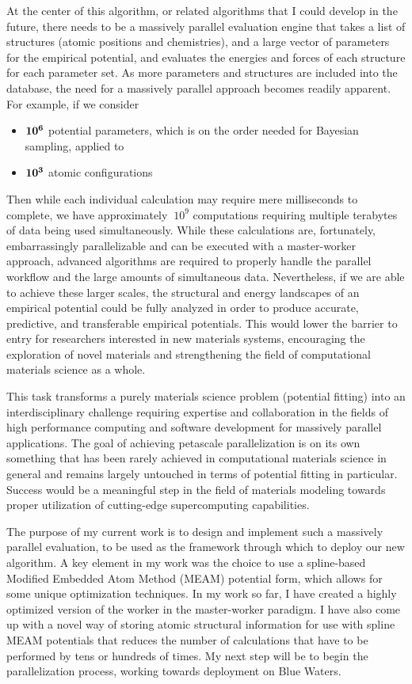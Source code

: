 \documentclass{article}
\begin{document}
At the center of this algorithm, or related algorithms that I could develop in the future, there needs to be a massively parallel evaluation engine that takes a list of structures (atomic positions and chemistries), and a large vector of parameters for the empirical potential, and evaluates the energies and forces of each structure for each parameter set. As more parameters and structures are included into the database, the need for a massively parallel approach becomes readily apparent. For example, if we consider

\begin{itemize}
    \item $\bf{10^6}$ potential parameters, which is on the order needed for Bayesian sampling, applied to
    \item $\bf{10^3}$ atomic configurations
\end{itemize}

\noindent Then while each individual calculation may require mere milliseconds to complete, we have approximately $~10^9$ computations requiring multiple terabytes of data being used simultaneously. While these calculations are, fortunately, embarrassingly parallelizable and can be executed with a master-worker approach, advanced algorithms are required to properly handle the parallel workflow and the large amounts of simultaneous data. Nevertheless, if we are able to achieve these larger scales, the structural and energy landscapes of an empirical potential could be fully analyzed in order to produce accurate, predictive, and transferable empirical potentials. This would lower the barrier to entry for researchers interested in new materials systems, encouraging the exploration of novel materials and strengthening the field of computational materials science as a whole.

This task transforms a purely materials science problem (potential fitting) into an interdisciplinary challenge requiring expertise and collaboration in the fields of high performance computing and software development for massively parallel applications. The goal of achieving petascale parallelization is on its own something that has been rarely achieved in computational materials science in general and remains largely untouched in terms of potential fitting in particular. Success would be a meaningful step in the field of materials modeling towards proper utilization of cutting-edge supercomputing capabilities.

The purpose of my current work is to design and implement such a massively parallel evaluation, to be used as the framework through which to deploy our new algorithm. A key element in my work was the choice to use a spline-based Modified Embedded Atom Method (MEAM) potential form, which allows for some unique optimization techniques. In my work so far, I have created a highly optimized version of the worker in the master-worker paradigm. I have also come up with a novel way of storing atomic structural information for use with spline MEAM potentials that reduces the number of calculations that have to be performed by tens or hundreds of times. My next step will be to begin the parallelization process, working towards deployment on Blue Waters.
\end{document}
